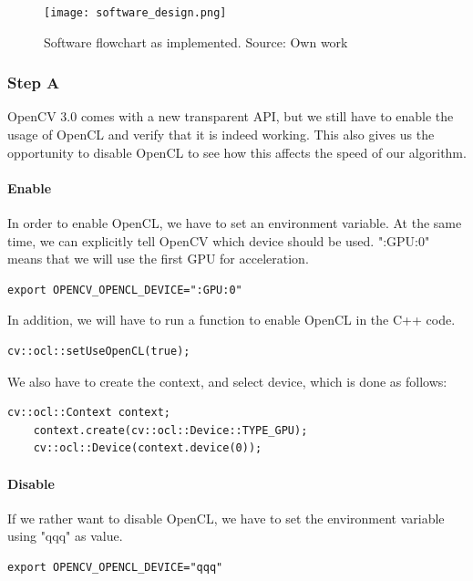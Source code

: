 \begin{figure}[ht]
    \centering
    \texttt{[image: software\_design.png]}
    \caption{Software flowchart as implemented. Source: Own work}
    \label{fig:software_design}
\end{figure}
\FloatBarrier

\subsubsection{Step A}
OpenCV 3.0 comes with a new transparent API, but we still have to enable the usage of OpenCL and verify that it is indeed working. This also gives us the opportunity to disable OpenCL to see how this affects the speed of our algorithm.

\paragraph{Enable}
In order to enable OpenCL, we have to set an environment variable. At the same time, we can explicitly tell OpenCV which device should be used. ":GPU:0" means that we will use the first GPU for acceleration.

\begin{lstlisting}[style=BashInputStyle]
    export OPENCV_OPENCL_DEVICE=":GPU:0"
\end{lstlisting}

In addition, we will have to run a function to enable OpenCL in the C++ code.

\begin{lstlisting}[style=BashInputStyle]
	cv::ocl::setUseOpenCL(true);
\end{lstlisting}

We also have to create the context, and select device, which is done as follows:

\begin{lstlisting}[style=BashInputStyle]
	cv::ocl::Context context;
	context.create(cv::ocl::Device::TYPE_GPU);
	cv::ocl::Device(context.device(0));
\end{lstlisting}


\paragraph{Disable}
If we rather want to disable OpenCL, we have to set the environment variable using "qqq" as value.

\begin{lstlisting}[style=BashInputStyle]
    export OPENCV_OPENCL_DEVICE="qqq"
\end{lstlisting}

